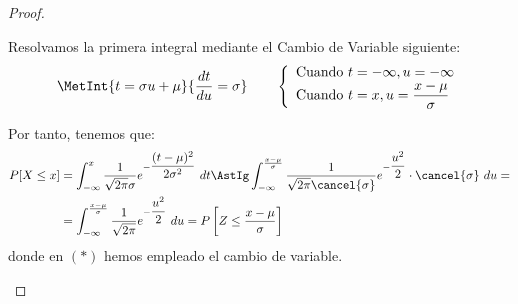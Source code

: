 \begin{proof}
\begin{enumerate}
        Resolvamos la primera integral mediante el Cambio de Variable siguiente:
        \begin{equation*}
            \MetInt{t = \sigma u + \mu}{\dfrac{dt}{du} = \sigma} \qquad
            \left\{
                \begin{array}{l}
                    \text{Cuando } t = -\infty, u = -\infty\\
                    \text{Cuando } t = x, u = \dfrac{x-\mu}{\sigma}
                \end{array}
            \right.
        \end{equation*}

        Por tanto, tenemos que:
        \begin{align*}
            P[X\leq x] &= \int_{-\infty}^{x} \dfrac{1}{\sqrt{2\pi}\sigma} e^{-\dfrac{(t-\mu)^2}{2\sigma^2}}~dt
            \AstIg \int_{-\infty}^{\frac{x-\mu}{\sigma}} \dfrac{1}{\sqrt{2\pi}\cancel{\sigma}} e^{-\dfrac{u^2}{2}}\cdot \cancel{\sigma} ~ du
            =\\&= \int_{-\infty}^{\frac{x-\mu}{\sigma}} \dfrac{1}{\sqrt{2\pi}} e^{-\dfrac{u^2}{2}}~du
            = P\left[Z\leq \dfrac{x-\mu}{\sigma}\right]
        \end{align*}
        donde en $(\ast)$ hemos empleado el cambio de variable.\qedhere
    \end{enumerate}
\end{proof}

